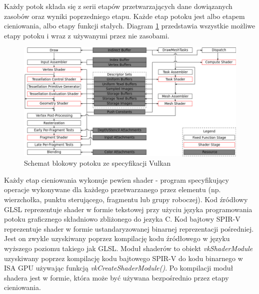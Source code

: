 Każdy potok składa się z serii etapów przetwarzających dane dowiązanych zasobów oraz wyniki poprzedniego etapu.
Każde etap potoku jest albo etapem cieniowania, albo etapy funkcji stałych. Diagram \ref{vulkan_pipelines} przedstawia wszystkie możliwe etapy potoku i wraz z używanymi przez nie zasobami.
\begin{figure}[htbp]
	\centering
	\includegraphics[width=1.0\textwidth]{images/vulkan_spec_pipeline.png}
	\caption{Schemat blokowy potoku ze specyfikacji Vulkan \cite{VULKANSPEC}}
	\label{vulkan_pipelines}
\end{figure}

Każdy etap cieniowania wykonuje pewien shader - program specyfikujący operacje wykonywane dla każdego przetwarzanego przez elementu (np. wierzchołka, punktu sterującego, fragmentu lub grupy roboczej).
Kod źródłowy GLSL reprezentuje shader w formie tekstowej przy użyciu języka programowania potoku graficznego składniowo zbliżonego do jezyka C.
Kod bajtowy SPIR-V reprezentuje shader w formie ustandaryzowanej binarnej reprezentacji pośredniej. Jest on zwykle uzyskiwany poprzez kompilację kodu źródłowego w języku wyższego poziomu takiego jak GLSL.
Moduł shaderów to obiekt \textit{vkShaderModule} uzyskiwany poprzez kompilację kodu bajtowego SPIR-V do kodu binarnego w ISA GPU używając funkcją \textit{vkCreateShaderModule()}.
Po kompilacji moduł shadera jest w formie, która może być używana bezpośrednio przez etapy cieniowania.

